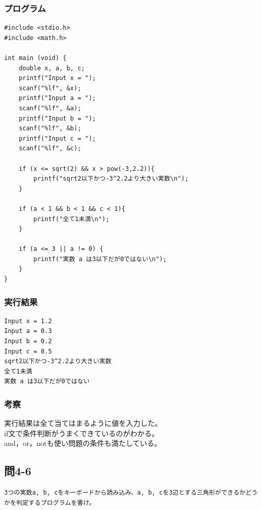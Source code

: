 \documentclass{jarticle}
\begin{document}
\subsubsection{プログラム\\}
\begin{breakbox}
\begin{verbatim}
#include <stdio.h>
#include <math.h>

int main (void) { 
    double x, a, b, c;
    printf("Input x = ");
    scanf("%lf", &x);
    printf("Input a = ");
    scanf("%lf", &a);
    printf("Input b = ");
    scanf("%lf", &b);
    printf("Input c = ");
    scanf("%lf", &c);

    if (x <= sqrt(2) && x > pow(-3,2.2)){
        printf("sqrt2以下かつ-3^2.2より大きい実数\n");
    }

    if (a < 1 && b < 1 && c < 1){
        printf("全て1未満\n");
    }

    if (a <= 3 || a != 0) {
        printf("実数 a は3以下だが0ではない\n");
    }
}
\end{verbatim}
\end{breakbox}
\subsubsection{実行結果\\}
\begin{breakbox}
\begin{verbatim}
Input x = 1.2
Input a = 0.3
Input b = 0.2
Input c = 0.5
sqrt2以下かつ-3^2.2より大きい実数
全て1未満
実数 a は3以下だが0ではない
\end{verbatim}
\end{breakbox}
\subsubsection{考察\\}
実行結果は全て当てはまるように値を入力した。\\
if文で条件判断がうまくできているのがわかる。\\
and，or，notも使い問題の条件も満たしている。\\

\subsection{問4-6\\}
\begin{verbatim}
3つの実数a, b, cをキーボードから読み込み、a, b, cを3辺とする三角形ができるかどうかを判定するプログラムを書け。
\end{verbatim}
\end{document}
